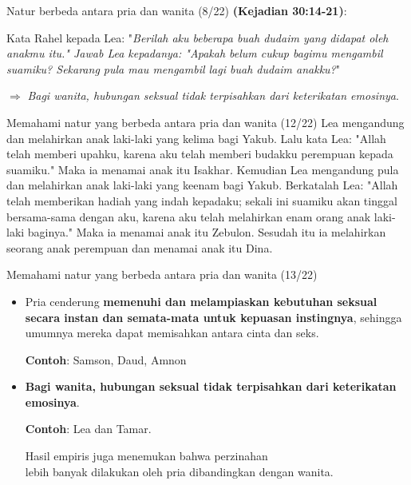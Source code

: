 \documentclass{beamer}
\theoremstyle{mystyle}
\let\emph\relax %
\begin{document}
\begin{frame}{Natur berbeda antara pria dan wanita (8/22)}
 \emph{Lea} \textbf{(Kejadian 30:14-21)}: 

\bigskip
{} Kata Rahel kepada Lea: "\textit{Berilah aku beberapa buah dudaim yang didapat oleh anakmu itu." Jawab Lea kepadanya: "Apakah belum cukup bagimu mengambil suamiku? Sekarang pula mau mengambil lagi buah dudaim anakku?}"

\bigskip
{} $\Longrightarrow$ \textit{Bagi wanita, hubungan seksual tidak terpisahkan dari keterikatan emosinya}.
\end{frame}

\begin{frame}{Memahami natur yang berbeda antara pria dan wanita (12/22)}
Lea mengandung dan melahirkan anak laki-laki yang kelima bagi Yakub. Lalu kata Lea: "Allah telah memberi upahku, karena aku telah memberi budakku perempuan kepada suamiku." Maka ia menamai anak itu Isakhar. Kemudian Lea mengandung pula dan melahirkan anak laki-laki yang keenam bagi Yakub. Berkatalah Lea: "Allah telah memberikan hadiah yang indah kepadaku; sekali ini suamiku akan tinggal bersama-sama dengan aku, karena aku telah melahirkan enam orang anak laki-laki baginya." Maka ia menamai anak itu Zebulon. Sesudah itu ia melahirkan seorang anak perempuan dan menamai anak itu Dina. 	
\end{frame}

\begin{frame}{Memahami natur yang berbeda antara pria dan wanita (13/22)}
		\begin{itemize}
		\item Pria cenderung \textbf{memenuhi dan melampiaskan kebutuhan seksual secara instan dan semata-mata untuk kepuasan instingnya}, sehingga umumnya mereka dapat memisahkan antara cinta dan seks.
		
		\bigskip
		
		\textbf{Contoh}: Samson, Daud, Amnon 
		
		\bigskip
		
		\item \textbf{Bagi wanita, hubungan seksual tidak terpisahkan dari keterikatan emosinya}.
		
		\bigskip
		
		\textbf{Contoh}: Lea dan Tamar.
		
		\bigskip
		
		Hasil empiris juga menemukan bahwa perzinahan \\
		lebih banyak dilakukan oleh pria dibandingkan dengan wanita. 		
	\end{itemize}			
\end{frame}
\end{document}
